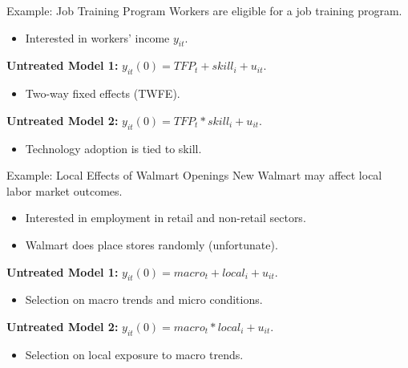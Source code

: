 \documentclass{beamer}
\newcommand{\1}{\mathds{1}} %
\begin{document}
\begin{frame}{Example: Job Training Program}
    Workers are eligible for a job training program.
    \begin{itemize}
        \item Interested in workers' income $y_{it}$.
    \end{itemize}

    \vspace{.5cm} \pause

    \textbf{Untreated Model 1:} $y_{it}(0) = TFP_t + skill_i + u_{it}$.
    \begin{itemize}
        \item Two-way fixed effects (TWFE).
    \end{itemize}

    \vspace{.5cm} \pause
    
    \textbf{Untreated Model 2:} $y_{it}(0) = TFP_t * skill_i + u_{it}$.
    \begin{itemize}
        \item Technology adoption is tied to skill. 
    \end{itemize}
\end{frame}


\begin{frame}{Example: Local Effects of Walmart Openings}
    New Walmart may affect local labor market outcomes.
    \begin{itemize}
        \item Interested in employment in retail and non-retail sectors. 
        \item Walmart does place stores randomly (unfortunate).
    \end{itemize}

    \vspace{.5cm} \pause

    \textbf{Untreated Model 1:} $y_{it}(0) = macro_t + local_i + u_{it}$.
    \begin{itemize}
        \item Selection on macro trends and micro conditions.
    \end{itemize}

    \vspace{.5cm} \pause
    
    \textbf{Untreated Model 2:} $y_{it}(0) = macro_t * local_i + u_{it}$.
    \begin{itemize}
        \item Selection on local exposure to macro trends. 
    \end{itemize}
\end{frame}
\end{document}

